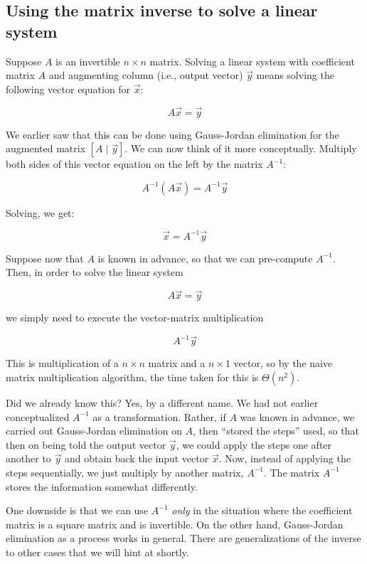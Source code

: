 \documentclass[10pt]{amsart}
\begin{document}
\subsection{Using the matrix inverse to solve a linear system}

Suppose $A$ is an invertible $n \times n$ matrix. Solving a linear
system with coefficient matrix $A$ and augmenting column (i.e., output
vector) $\vec{y}$ means solving the following vector equation for
$\vec{x}$:

$$A \vec{x} = \vec{y}$$

We earlier saw that this can be done using Gauss-Jordan elimination
for the augmented matrix $\left[ A \mid \vec{y} \right]$. We can now
think of it more conceptually. Multiply both sides of this vector
equation on the left by the matrix $A^{-1}$:

$$A^{-1}(A \vec{x}) = A^{-1}\vec{y}$$

Solving, we get:

$$\vec{x} = A^{-1}\vec{y}$$

Suppose now that $A$ is known in advance, so that we can pre-compute
$A^{-1}$. Then, in order to solve the linear system

$$A \vec{x} = \vec{y}$$

we simply need to execute the vector-matrix multiplication

$$A^{-1}\vec{y}$$

This is multiplication of a $n \times n$ matrix and a $n \times 1$
vector, so by the naive matrix multiplication algorithm, the time
taken for this is $\Theta(n^2)$.

Did we already know this? Yes, by a different name. We had not earlier
conceptualized $A^{-1}$ as a transformation. Rather, if $A$ was known
in advance, we carried out Gauss-Jordan elimination on $A$, then
``stored the steps'' used, so that then on being told the output
vector $\vec{y}$, we could apply the steps one after another to
$\vec{y}$ and obtain back the input vector $\vec{x}$. Now, instead of
applying the steps sequentially, we just multiply by another matrix,
$A^{-1}$. The matrix $A^{-1}$ stores the information somewhat differently.

One downside is that we can use $A^{-1}$ {\em only} in the situation
where the coefficient matrix is a square matrix and is invertible. On
the other hand, Gauss-Jordan elimination as a process works in
general. There are generalizations of the inverse to other cases that
we will hint at shortly.
\end{document}
